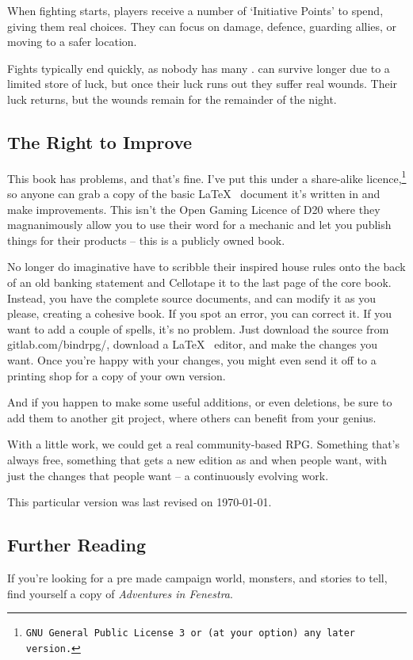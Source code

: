 \begin{multicols}{2}
When fighting starts, players receive a number of `Initiative Points' to spend, giving them real choices.
They can focus on damage, defence, guarding allies, or moving to a safer location.

Fights typically end quickly, as nobody has many .
 can survive longer due to a limited store of luck, but once their luck runs out they suffer real wounds.
Their luck returns, but the wounds remain for the remainder of the night.

\subsection*{The Right to Improve}

\noindent
This book has problems, and that's fine.
I've put this under a share-alike licence,\footnote{\tt GNU General Public License 3 or (at your option) any later version.} so anyone can grab a copy of the basic \LaTeX~ document it's written in and make improvements.
This isn't the Open Gaming Licence of D20 where they magnanimously allow you to use their word for a mechanic and let you publish things for their products -- this is a publicly owned book.

No longer do imaginative  have to scribble their inspired house rules onto the back of an old banking statement and Cellotape it to the last page of the core book.
Instead, you have the complete source documents, and can modify it as you please, creating a cohesive book.
If you spot an error, you can correct it.
If you want to add a couple of spells, it's no problem.
Just download the source from gitlab.com/bindrpg/, download a \LaTeX~ editor, and make the changes you want.
Once you're happy with your changes, you might even send it off to a printing shop for a copy of your own version.

And if you happen to make some useful additions, or even deletions, be sure to add them to another git project, where others can benefit from your genius.

With a little work, we could get a real community-based RPG.
Something that's always free, something that gets a new edition as and when people want, with just the changes that people want -- a continuously evolving work.

This particular version was last revised on \today.

\subsection*{Further Reading}

If you're looking for a pre made campaign world, monsters, and stories to tell, find yourself a copy of \textit{Adventures in Fenestra}.

\end{multicols}

